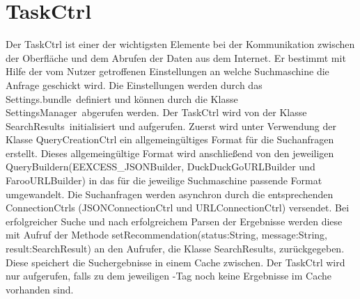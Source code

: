 
\section{TaskCtrl}

Der TaskCtrl ist einer der wichtigsten Elemente bei der Kommunikation zwischen der Oberfläche und dem Abrufen der Daten aus dem Internet. Er bestimmt mit Hilfe der vom Nutzer getroffenen Einstellungen an welche Suchmaschine die Anfrage geschickt wird. Die Einstellungen werden durch das \glqq Settings.bundle\grqq\ definiert und können durch die Klasse \glqq SettingsManager\grqq\ abgerufen werden. Der TaskCtrl wird von der Klasse \glqq SearchResults\grqq\ initialisiert und aufgerufen. Zuerst wird unter Verwendung der Klasse \glqq QueryCreationCtrl \grqq\xspace ein allgemeingültiges Format für die Suchanfragen erstellt. Dieses allgemeingültige Format wird anschließend von den jeweiligen \glqq QueryBuildern\grqq\xspace (EEXCESS\_JSONBuilder, DuckDuckGoURLBuilder und FarooURLBuilder) in das für die jeweilige Suchmaschine passende Format umgewandelt. Die Suchanfragen werden asynchron durch die entsprechenden \glqq ConnectionCtrls \grqq\xspace (JSONConnectionCtrl und URLConnectionCtrl) versendet. Bei erfolgreicher Suche und nach erfolgreichem Parsen der Ergebnisse werden diese mit Aufruf der Methode \glqq setRecommendation(status:String, message:String, result:SearchResult) \grqq\xspace an den Aufrufer, die Klasse SearchResults, zurückgegeben. Diese speichert die Suchergebnisse in einem Cache zwischen. Der TaskCtrl wird nur aufgerufen, falls zu dem jeweiligen \SEARCH-Tag noch keine Ergebnisse im Cache vorhanden sind. 

